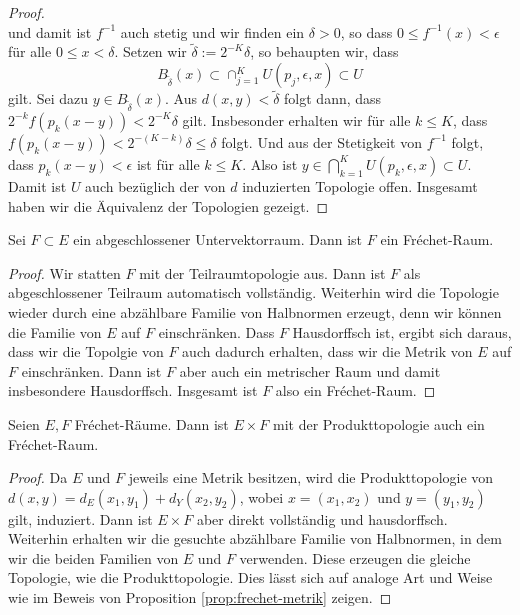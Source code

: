 \begin{proof}
\[  \]
  und damit ist $f^{-1}$ auch stetig und wir finden ein $\delta > 0$,
  so dass $0 \leq f^{-1}(x) < \epsilon$ für alle $0 \leq x <
  \delta$. Setzen wir $\tilde \delta := 2^{-K} \delta$, so behaupten
  wir, dass
  \[
  B_{\tilde \delta}(x) \subset \cap_{j=1}^K U(p_j,
  \epsilon, x) \subset U
  \]
  gilt. Sei dazu $y \in B_{\tilde
      \delta}(x)$. Aus $d(x,y) < \tilde \delta$ folgt dann, dass
    $2^{-k} f(p_k(x-y)) < 2^{-K} \delta$ gilt. Insbesonder erhalten
    wir für alle $k \leq K$, dass $f(p_k(x-y)) < 2^{-(K-k)} \delta
    \leq \delta$ folgt. Und aus der Stetigkeit von $f^{-1}$ folgt, dass
    $p_k(x-y) < \epsilon$ ist für alle $k \leq K$. Also ist $y \in
    \bigcap_{k=1}^K U(p_k, \epsilon, x) \subset U$. Damit ist $U$ auch
    bezüglich der von $d$ induzierten Topologie offen. Insgesamt haben
    wir die Äquivalenz der Topologien gezeigt.
\end{proof}
  
\begin{thm}
  \label{thm:frechet-abgeschlossen}
  Sei $F \subset E$ ein abgeschlossener Untervektorraum. Dann ist $F$
  ein Fr\'echet-Raum.
\end{thm}

\begin{proof}
  Wir statten $F$ mit der Teilraumtopologie aus. Dann ist $F$
  als abgeschlossener Teilraum automatisch vollständig. Weiterhin wird
  die Topologie wieder durch eine abzählbare Familie von Halbnormen
  erzeugt, denn wir können die Familie von $E$ auf $F$
  einschränken. Dass $F$ Hausdorffsch ist, ergibt sich daraus, dass
  wir die Topolgie von $F$ auch dadurch erhalten, dass wir die Metrik
  von $E$ auf $F$ einschränken. Dann ist $F$ aber auch ein metrischer
  Raum und damit insbesondere Hausdorffsch. Insgesamt ist $F$ also ein
  Fr\'echet-Raum.
\end{proof}

\begin{thm}
  \label{thm:frechet-summe}
  Seien $E, F$ Fr\'echet-Räume. Dann ist $E \times F$ mit der
  Produkttopologie auch ein Fr\'echet-Raum.
\end{thm}

\begin{proof}
  Da $E$ und $F$ jeweils eine Metrik besitzen, wird die
  Produkttopologie von $d(x,y) = d_E(x_1, y_1) + d_Y(x_2, y_2)$, wobei
  $x = (x_1,x_2)$ und $y = (y_1, y_2)$ gilt, induziert. Dann ist $E
  \times F$ aber direkt vollständig und hausdorffsch. Weiterhin
  erhalten wir die gesuchte abzählbare Familie von Halbnormen, in dem
  wir die beiden Familien von $E$ und $F$ verwenden. Diese erzeugen
  die gleiche Topologie, wie die Produkttopologie. Dies lässt sich auf
  analoge Art und Weise wie im Beweis von Proposition
  \ref{prop:frechet-metrik} zeigen.
\end{proof}

